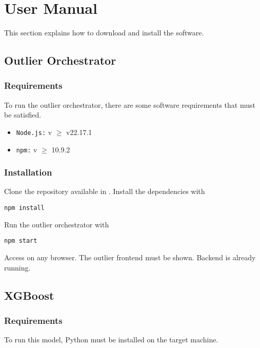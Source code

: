 \chapter{User Manual}

This section explains how to download and install the software.

\section{Outlier Orchestrator}

\subsection{Requirements}

To run the outlier orchestrator, there are some software requirements that must be satisfied.

\begin{itemize}
    \item \texttt{Node.js:} v $\geq$ v22.17.1
    \item \texttt{\ac{npm}:} v $\geq$ 10.9.2
\end{itemize}

\subsection{Installation}

Clone the repository available in \autocite{OutlierClassifierOutlier_orchestrator2025}. Install the dependencies with 

\begin{lstlisting}[caption={Using \ac{npm} to install dependencies}]
    npm install 
\end{lstlisting}

Run the outlier orchestrator with

\begin{lstlisting}[caption={Running the outlier orchestrator}]
    npm start
\end{lstlisting}

Access  on any browser. The outlier frontend must be shown. Backend is already running.

\section{XGBoost}

\subsection{Requirements}

To run this model, Python must be installed on the target machine.
